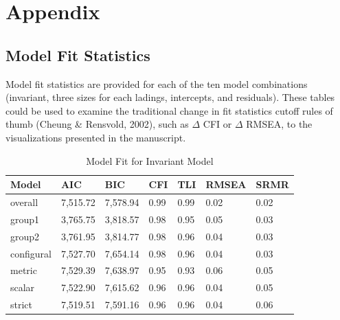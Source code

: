 \documentclass[
  man]{apa6}
\begin{document}
\newpage

\hypertarget{appendix}{%
\section{Appendix}\label{appendix}}

\hypertarget{model-fit-statistics}{%
\subsection{Model Fit Statistics}\label{model-fit-statistics}}

Model fit statistics are provided for each of the ten model combinations (invariant, three sizes for each ladings, intercepts, and residuals). These tables could be used to examine the traditional change in fit statistics cutoff rules of thumb (Cheung \& Rensvold, 2002), such as \(\Delta\) CFI or \(\Delta\) RMSEA, to the visualizations presented in the manuscript.

\begin{table}[tbp]

\begin{center}
\begin{threeparttable}

\caption{\label{tab:tab1}Model Fit for Invariant Model}

\begin{tabular}{lllllll}
\toprule
Model & AIC & BIC & CFI & TLI & RMSEA & SRMR\\
\midrule
overall & 7,515.72 & 7,578.94 & 0.99 & 0.99 & 0.02 & 0.02\\
group1 & 3,765.75 & 3,818.57 & 0.98 & 0.95 & 0.05 & 0.03\\
group2 & 3,761.95 & 3,814.77 & 0.98 & 0.96 & 0.04 & 0.03\\
configural & 7,527.70 & 7,654.14 & 0.98 & 0.96 & 0.04 & 0.03\\
metric & 7,529.39 & 7,638.97 & 0.95 & 0.93 & 0.06 & 0.05\\
scalar & 7,522.90 & 7,615.62 & 0.96 & 0.96 & 0.04 & 0.05\\
strict & 7,519.51 & 7,591.16 & 0.96 & 0.96 & 0.04 & 0.06\\
\bottomrule
\end{tabular}

\end{threeparttable}
\end{center}

\end{table}
\end{document}
